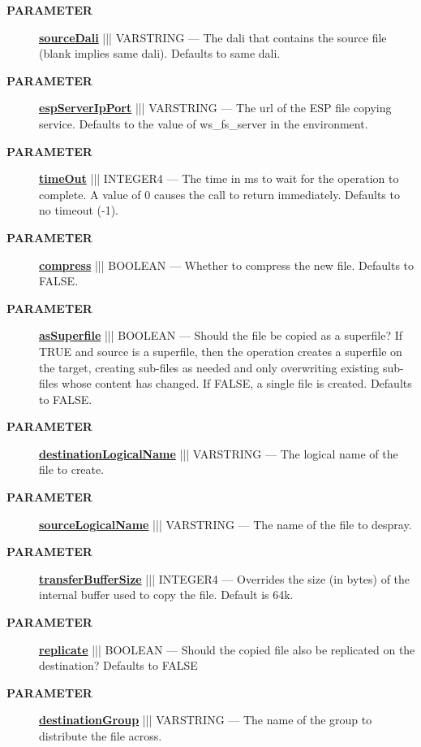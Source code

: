 \par
\begin{description}
\item [\colorbox{tagtype}{\color{white} \textbf{\textsf{PARAMETER}}}] \textbf{\underline{sourceDali}} ||| VARSTRING --- The dali that contains the source file (blank implies same dali). Defaults to same dali.
\item [\colorbox{tagtype}{\color{white} \textbf{\textsf{PARAMETER}}}] \textbf{\underline{espServerIpPort}} ||| VARSTRING --- The url of the ESP file copying service. Defaults to the value of ws\_fs\_server in the environment.
\item [\colorbox{tagtype}{\color{white} \textbf{\textsf{PARAMETER}}}] \textbf{\underline{timeOut}} ||| INTEGER4 --- The time in ms to wait for the operation to complete. A value of 0 causes the call to return immediately. Defaults to no timeout (-1).
\item [\colorbox{tagtype}{\color{white} \textbf{\textsf{PARAMETER}}}] \textbf{\underline{compress}} ||| BOOLEAN --- Whether to compress the new file. Defaults to FALSE.
\item [\colorbox{tagtype}{\color{white} \textbf{\textsf{PARAMETER}}}] \textbf{\underline{asSuperfile}} ||| BOOLEAN --- Should the file be copied as a superfile? If TRUE and source is a superfile, then the operation creates a superfile on the target, creating sub-files as needed and only overwriting existing sub-files whose content has changed. If FALSE, a single file is created. Defaults to FALSE.
\item [\colorbox{tagtype}{\color{white} \textbf{\textsf{PARAMETER}}}] \textbf{\underline{destinationLogicalName}} ||| VARSTRING --- The logical name of the file to create.
\item [\colorbox{tagtype}{\color{white} \textbf{\textsf{PARAMETER}}}] \textbf{\underline{sourceLogicalName}} ||| VARSTRING --- The name of the file to despray.
\item [\colorbox{tagtype}{\color{white} \textbf{\textsf{PARAMETER}}}] \textbf{\underline{transferBufferSize}} ||| INTEGER4 --- Overrides the size (in bytes) of the internal buffer used to copy the file. Default is 64k.
\item [\colorbox{tagtype}{\color{white} \textbf{\textsf{PARAMETER}}}] \textbf{\underline{replicate}} ||| BOOLEAN --- Should the copied file also be replicated on the destination? Defaults to FALSE
\item [\colorbox{tagtype}{\color{white} \textbf{\textsf{PARAMETER}}}] \textbf{\underline{destinationGroup}} ||| VARSTRING --- The name of the group to distribute the file across.

\end{description}
